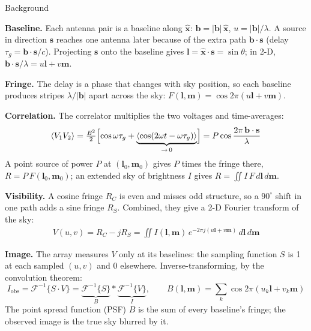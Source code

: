 \documentclass[final]{beamer}
\newlength{\colwidth}
\begin{document}
\begin{frame}[t]
\begin{columns}[t, totalwidth=\paperwidth]
\begin{column}{\colwidth}
\begin{exampleblock}{Background}
\begin{minipage}[c]{0.57\linewidth}
          \textbf{Baseline.} Each antenna pair is a baseline along $\hat{\mathbf{x}}$:
          $\mathbf{b}=|\mathbf{b}|\,\hat{\mathbf{x}}$, $u=|\mathbf{b}|/\lambda$. A source in direction
          $\mathbf{s}$ reaches one antenna later because of the extra path $\mathbf{b}\cdot\mathbf{s}$
          (delay $\tau_g=\mathbf{b}\cdot\mathbf{s}/c$). Projecting $\mathbf{s}$ onto the baseline gives
          $\boldsymbol{l}=\hat{\mathbf{x}}\cdot\mathbf{s}=\sin\theta$; in 2-D,
          $\mathbf{b}\cdot\mathbf{s}/\lambda=u\boldsymbol{l}+v\boldsymbol{m}$.
        \end{minipage}\hfill
        \begin{minipage}[c]{0.41\linewidth}
          \centering
        \end{minipage}

        \textbf{Fringe.} The delay is a phase that changes with sky position, so each baseline
        produces stripes $\lambda/|\mathbf{b}|$ apart across the sky:
        $F(\boldsymbol{l},\boldsymbol{m})=\cos 2\pi(u\boldsymbol{l}+v\boldsymbol{m})$.

        \textbf{Correlation.} The correlator multiplies the two voltages and time-averages:
        \[
          \langle V_1V_2\rangle=\tfrac{E^2}{2}\Bigl[\cos\omega\tau_g+
            \underbrace{\langle\cos(2\omega t-\omega\tau_g)\rangle}_{\to\,0}\Bigr]
          =P\cos\frac{2\pi\,\mathbf{b}\cdot\mathbf{s}}{\lambda}
        \]
        A point source of power $P$ at $(\boldsymbol{l}_0,\boldsymbol{m}_0)$ gives $P$ times the
        fringe there, $R=P\,F(\boldsymbol{l}_0,\boldsymbol{m}_0)$; an extended sky of brightness
        $I$ gives $R=\iint I\,F\,d\boldsymbol{l}\,d\boldsymbol{m}$.

        \textbf{Visibility.} A cosine fringe $R_C$ is even and misses odd structure, so a
        $90^\circ$ shift in one path adds a sine fringe $R_S$. Combined, they give a 2-D
        Fourier transform of the sky:
        \begin{gather*}
          V(u,v)=R_C-jR_S=\iint I(\boldsymbol{l},\boldsymbol{m})\,
          e^{-2\pi j(u\boldsymbol{l}+v\boldsymbol{m})}\,d\boldsymbol{l}\,d\boldsymbol{m}
        \end{gather*}

        \textbf{Image.} The array measures $V$ only at its baselines: the sampling function
        $S$ is 1 at each sampled $(u,v)$ and 0 elsewhere. Inverse-transforming, by the
        convolution theorem:
        \[
          I_{\text{obs}}=\mathcal{F}^{-1}\{S\cdot V\}
          =\underbrace{\mathcal{F}^{-1}\{S\}}_{B}\ast\underbrace{\mathcal{F}^{-1}\{V\}}_{I},
          \qquad B(\boldsymbol{l},\boldsymbol{m})=\sum_k\cos 2\pi(u_k\boldsymbol{l}+v_k\boldsymbol{m})
        \]
        The point spread function (PSF) $B$ is the sum of every baseline's fringe; the observed image is the
        true sky blurred by it.
      \end{exampleblock}


\end{column}
\end{columns}
\end{frame}
\end{document}
